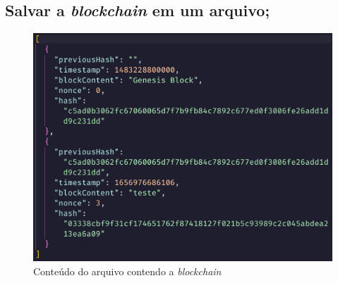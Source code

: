 \documentclass{article}
\begin{document}
\subsection{Salvar a \textit{blockchain} em um arquivo;}

\begin{figure}[H]
\begin{center}
\includegraphics[scale=0.5]{outputFile.png}
  \caption{Conteúdo do arquivo contendo a \textit{blockchain}}
\end{center}
\end{figure}
\end{document}
